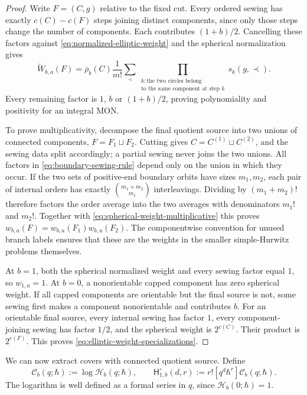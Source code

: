 \documentclass[11pt,a4paper,reqno]{article}
\theoremstyle{definition}
\theoremstyle{remark}
\newcommand\Hb{{\mathsf H}}
\begin{document}
\begin{proof}
Write $F=(C,g)$ relative to the fixed cut.  Every ordered sewing has exactly $c(C)-c(F)$ steps joining distinct components, since only those steps change the number of components.  Each contributes $(1+b)/2$.  Cancelling these factors against \eqref{eq:normalized-elliptic-weight} and the spherical normalization gives
\begin{equation}\label{eq:normalized-weight-product}
\widetilde W_{b,a}(F)=\overline\rho_b(C)\frac1{m!}\sum_{\prec}\prod_{\substack{k:\text{the two circles belong}\\
\text{to the same component at step }k}}s_k(g,\prec).
\end{equation}
Every remaining factor is $1$, $b$ or $(1+b)/2$, proving polynomiality and positivity for an integral MON.

To prove multiplicativity, decompose the final quotient source into two unions of connected components, $F=F_1\sqcup F_2$.  Cutting gives $C=C^{(1)}\sqcup C^{(2)}$, and the sewing data split accordingly; a partial sewing never joins the two unions.  All factors in \eqref{eq:boundary-sewing-rule} depend only on the union in which they occur.  If the two sets of positive-end boundary orbits have sizes $m_1,m_2$, each pair of internal orders has exactly $\binom{m_1+m_2}{m_1}$ interleavings.  Dividing by $(m_1+m_2)!$ therefore factors the order average into the two averages with denominators $m_1!$ and $m_2!$.  Together with \eqref{eq:spherical-weight-multiplicative} this proves $w_{b,a}(F)=w_{b,a}(F_1)w_{b,a}(F_2)$.  The componentwise convention for unused branch labels ensures that these are the weights in the smaller simple-Hurwitz problems themselves.

At $b=1$, both the spherical normalized weight and every sewing factor equal $1$, so $w_{1,a}=1$.  At $b=0$, a nonorientable capped component has zero spherical weight.  If all capped components are orientable but the final source is not, some sewing first makes a component nonorientable and contributes $b$.  For an orientable final source, every internal sewing has factor $1$, every component-joining sewing has factor $1/2$, and the spherical weight is $2^{c(C)}$.  Their product is $2^{c(F)}$.  This proves \eqref{eq:elliptic-weight-specializations}.
\end{proof}

We can now extract covers with connected quotient source.  Define
\begin{equation}\label{eq:connected-elliptic-series}
\mathscr C_b(q;\hbar):=\log\mathscr H_b(q;\hbar), \qquad \Hb^\circ_{1,b}(d,r):=r![q^d\hbar^r]\mathscr C_b(q;\hbar).
\end{equation}
The logarithm is well defined as a formal series in $q$, since $\mathscr H_b(0;\hbar)=1$.
\end{document}
